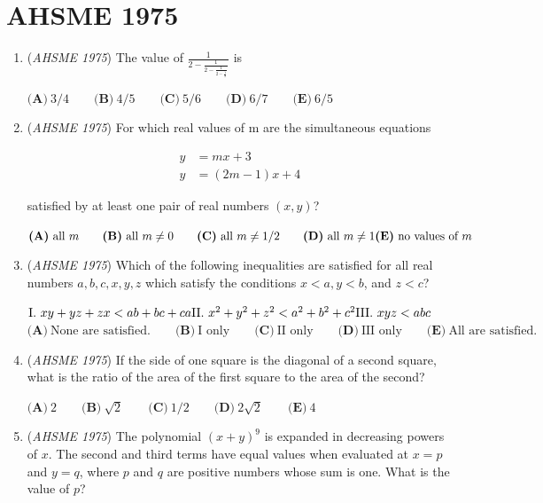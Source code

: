 \section{AHSME 1975}
        \begin{enumerate}
        	\item (\textit{AHSME 1975}) The value of $\frac {1}{2 - \frac {1}{2 - \frac {1}{2 - \frac12}}}$ is 


 $\textbf{(A)}\ 3/4 \qquad  \textbf{(B)}\ 4/5 \qquad  \textbf{(C)}\ 5/6 \qquad  \textbf{(D)}\ 6/7 \qquad  \textbf{(E)}\ 6/5$


	\item (\textit{AHSME 1975}) For which real values of m are the simultaneous equations 

 \begin{align*}y &= mx + 3 \\  y& = (2m - 1)x + 4\end{align*}
 
satisfied by at least one pair of real numbers $(x,y)$? 


 $\textbf{(A)}\ \text{all }m\qquad \textbf{(B)}\ \text{all }m\neq 0\qquad \textbf{(C)}\ \text{all }m\neq 1/2\qquad \textbf{(D)}\ \text{all }m\neq 1\qquad \\ \textbf{(E)}\ \text{no values of }m$


	\item (\textit{AHSME 1975}) Which of the following inequalities are satisfied for all real numbers $a, b, c, x, y, z$ which satisfy the conditions $x < a, y < b$, and $z < c$? 


 $\text{I}. \ xy + yz + zx < ab + bc + ca \\ \text{II}. \ x^2 + y^2 + z^2 < a^2 + b^2 + c^2 \\ \text{III}. \ xyz < abc$
$\textbf{(A)}\ \text{None are satisfied.} \qquad  \textbf{(B)}\ \text{I only} \qquad  \textbf{(C)}\ \text{II only} \qquad  \textbf{(D)}\ \text{III only} \qquad  \textbf{(E)}\ \text{All are satisfied.}$


	\item (\textit{AHSME 1975}) If the side of one square is the diagonal of a second square, what is the ratio of the area of the first square to the area of the second? 


 $\textbf{(A)}\ 2 \qquad  \textbf{(B)}\ \sqrt2 \qquad  \textbf{(C)}\ 1/2 \qquad  \textbf{(D)}\ 2\sqrt2 \qquad  \textbf{(E)}\ 4$


	\item (\textit{AHSME 1975}) The polynomial $(x+y)^9$ is expanded in decreasing powers of $x$. The second and third terms have equal values 
when evaluated at $x=p$ and $y=q$, where $p$ and $q$ are positive numbers whose sum is one. What is the value of $p$? 



\end{enumerate}
